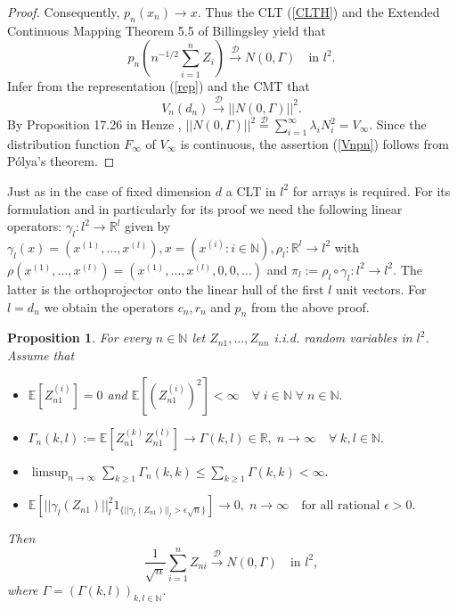 \documentclass[sn-mathphys,Numbered]{sn-jnl}%
\theoremstyle{thmstyleone}%
\newtheorem{proposition}[theorem]{Proposition}%
\theoremstyle{thmstyletwo}%
\theoremstyle{thmstylethree}%
\begin{document}
\begin{proof}
 Consequently, $p_n(x_n) \rightarrow x$. Thus the CLT (\ref{CLTH}) and the Extended Continuous Mapping Theorem 5.5 of Billingsley \cite{Billingsley} yield that
$$
  p_n(n^{-1/2} \sum_{i=1}^n Z_i) \stackrel{\mathcal{D}}{\rightarrow} N(0,\Gamma) \quad \text{in } l^2.
$$
Infer from the representation (\ref{rep}) and the CMT that
$$
 V_n(d_n) \stackrel{\mathcal{D}}{\rightarrow} ||N(0,\Gamma)||^2.
$$
By Proposition 17.26 in Henze \cite{Henze}, $||N(0,\Gamma)||^2 \stackrel{\mathcal{D}}{=} \sum_{i=1}^\infty \lambda_i N_i^2 = V_\infty$. Since the distribution function $F_\infty$ of $V_\infty$ is continuous, the assertion (\ref{Vnpn}) follows from P\'{o}lya's theorem.
\end{proof}

Just as in the case of fixed dimension $d$ a CLT in $l^2$ for arrays is required. For its formulation and in particularly for its proof we need
the following linear operators: $\gamma_l:l^2 \rightarrow \mathbb{R}^l$ given by $\gamma_l(x)=(x^{(1)},\ldots,x^{(l)}), x=(x^{(i)}: i \in \mathbb{N}), \rho_l:\mathbb{R}^l \rightarrow l^2$ with $\rho(x^{(1)},\ldots,x^{(l)})=(x^{(1)},\ldots,x^{(l)},0,0,\ldots)$ and $\pi_l:= \rho_l\circ \gamma_l: l^2 \rightarrow l^2.$ The latter is the orthoprojector onto the linear hull of the first $l$ unit vectors. For $l=d_n$ we obtain the operators $c_n, r_n$ and $p_n$ from the above proof.\\

\begin{proposition} \label{CLTl2arrays} For every $n \in \mathbb{N}$ let $Z_{n1},\ldots,Z_{nn}$ i.i.d. random variables in $l^2$.
Assume that
\begin{itemize}
\item[(1)] $\mathbb{E}[Z_{n1}^{(i)}]=0$ and $\mathbb{E}[(Z_{n1}^{(i)})^2] < \infty \quad \forall \; i \in \mathbb{N} \; \forall \; n \in \mathbb{N}.$\\

\item[(2)] $\Gamma_n(k,l):= \mathbb{E}[Z_{n1}^{(k)} Z_{n1}^{(l)}] \rightarrow \Gamma(k,l) \in \mathbb{R}, \; n \rightarrow \infty \quad \forall \; k,l \in \mathbb{N}.$\\

\item[(3)] $\limsup_{n \rightarrow \infty} \sum_{k \ge 1} \Gamma_n(k,k) \le \sum_{k \ge 1} \Gamma(k,k) < \infty.$\\

\item[(4)] $\mathbb{E}[||\gamma_l(Z_{n1})||_l^2 1_{\{||\gamma_l(Z_{n1})||_l > \epsilon \sqrt{n}\}}] \rightarrow 0, \; n \rightarrow \infty \quad \text{for all rational } \epsilon>0.$\\
\end{itemize}
Then
\begin{equation} \label{CLTl2}
  \frac{1}{\sqrt{n}} \sum_{i=1}^n Z_{ni} \stackrel{\mathcal{D}}{\rightarrow} N(0,\Gamma) \quad \text{in } l^2,
\end{equation}
where $\Gamma= (\Gamma(k,l))_{k,l \in \mathbb{N}}.$
\end{proposition}
\end{document}

